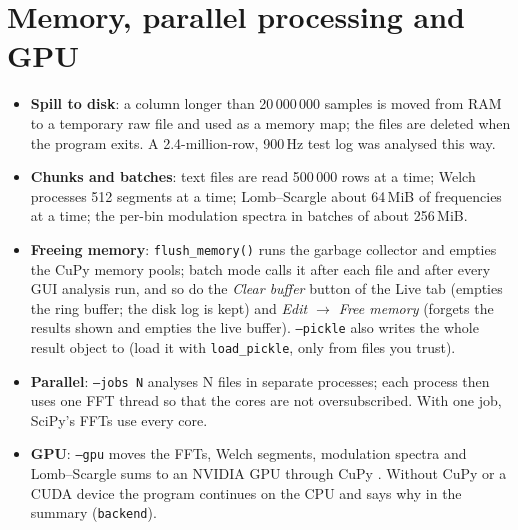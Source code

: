 \documentclass[10pt,letterpaper]{article}
\numberwithin{equation}{section}
\begin{document}
\section{Memory, parallel processing and GPU}\label{sec:memory}
\begin{itemize}
\item \textbf{Spill to disk}: a column longer than 20\,000\,000 samples is moved
from RAM to a temporary raw file and used as a memory map; the files are
deleted when the program exits. A 2.4-million-row, 900\,Hz test log was
analysed this way.
\item \textbf{Chunks and batches}: text files are read 500\,000 rows at a time;
Welch processes 512 segments at a time; Lomb--Scargle about 64\,MiB of
frequencies at a time; the per-bin modulation spectra in batches of about
256\,MiB.
\item \textbf{Freeing memory}: \texttt{flush\_memory()} runs the garbage
collector and empties the CuPy memory pools; batch mode calls it after each
file and after every GUI analysis run, and so do the \emph{Clear buffer} button of
the Live tab (empties the ring buffer; the disk log is kept) and \emph{Edit
$\rightarrow$ Free memory} (forgets the results shown and empties the live buffer).
\texttt{--pickle} also writes the whole result object to
 (load it with \texttt{load\_pickle}, only from files you
trust).
\item \textbf{Parallel}: \texttt{--jobs N} analyses N files in separate processes;
each process then uses one FFT thread so that the cores are not
oversubscribed. With one job, SciPy's FFTs use every core.
\item \textbf{GPU}: \texttt{--gpu} moves the FFTs, Welch segments, modulation
spectra and Lomb--Scargle sums to an NVIDIA GPU through CuPy \cite{B27}. Without
CuPy or a CUDA device the program continues on the CPU and says why in the
summary (\texttt{backend}).
\end{itemize}

\end{document}
